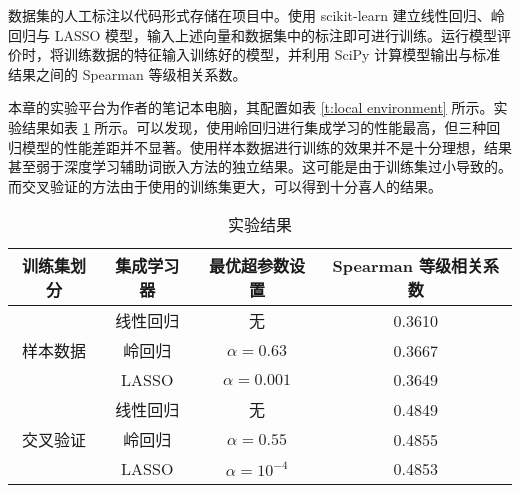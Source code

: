 数据集的人工标注以代码形式存储在项目中。使用 scikit-learn 建立线性回归、岭回归与 LASSO 模型，输入上述向量和数据集中的标注即可进行训练。运行模型评价时，将训练数据的特征输入训练好的模型，并利用 SciPy 计算模型输出与标准结果之间的 Spearman 等级相关系数。

本章的实验平台为作者的笔记本电脑，其配置如表 \ref{t:local environment} 所示。实验结果如表 \ref{t:ensemble result} 所示。可以发现，使用岭回归进行集成学习的性能最高，但三种回归模型的性能差距并不显著。使用样本数据进行训练的效果并不是十分理想，结果甚至弱于深度学习辅助词嵌入方法的独立结果。这可能是由于训练集过小导致的。而交叉验证的方法由于使用的训练集更大，可以得到十分喜人的结果。

\begin{table}[h]
	\caption{环境配置}
	\label{t:local environment}
	\vspace{0.5em}\centering\wuhao
\end{table}

\begin{table}[H]
	\caption{实验结果}
	\label{t:ensemble result}
	\vspace{0.5em}\centering\wuhao
	\begin{tabular}{cccc}
		\toprule[1.5pt]
		训练集划分 & 集成学习器 & 最优超参数设置 & Spearman 等级相关系数 \\
		\midrule[1pt]
		\multirow{3}{*}{样本数据} & 线性回归 & 无 & 0.3610 \\
		& 岭回归 & $\alpha = 0.63$ & 0.3667 \\
		& LASSO & $\alpha = 0.001$ & 0.3649 \\
		\hline
		\multirow{3}{*}{交叉验证} & 线性回归 & 无 & 0.4849 \\
		& 岭回归 & $\alpha = 0.55$ & 0.4855 \\
		& LASSO & $\alpha = 10^{-4}$ & 0.4853 \\
		\bottomrule[1.5pt]
	\end{tabular}
\end{table}